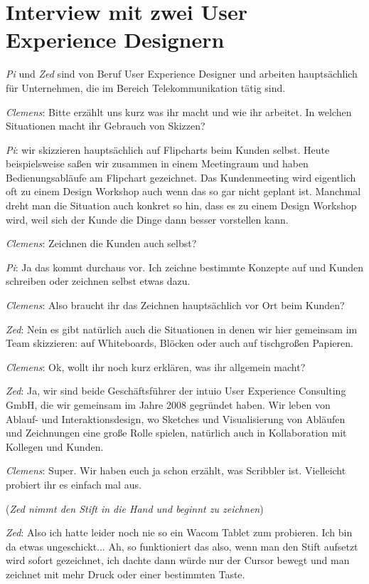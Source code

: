 \clearpage
\section{Interview mit zwei User Experience Designern}
\emph{Pi} und \emph{Zed} sind von Beruf User Experience Designer und arbeiten hauptsächlich für Unternehmen, die im Bereich Telekommunikation tätig sind. 

\medskip \emph{Clemens}: Bitte erzählt uns kurz was ihr macht und wie ihr arbeitet. In welchen Situationen macht ihr Gebrauch von Skizzen?

\medskip \emph{Pi}: wir skizzieren hauptsächlich auf Flipcharts beim Kunden selbst. Heute beispielsweise saßen wir zusammen in einem Meetingraum und haben Bedienungsabläufe am Flipchart gezeichnet. Das Kundenmeeting wird eigentlich oft zu einem Design Workshop auch wenn das so gar nicht geplant ist. Manchmal dreht man die Situation auch konkret so hin, dass es zu einem Design Workshop wird, weil sich der Kunde die Dinge dann besser vorstellen kann.

\medskip \emph{Clemens}: Zeichnen die Kunden auch selbst?

\medskip \emph{Pi}: Ja das kommt durchaus vor. Ich zeichne bestimmte Konzepte auf und Kunden schreiben oder zeichnen selbst etwas dazu.

\medskip \emph{Clemens}: Also braucht ihr das Zeichnen hauptsächlich vor Ort beim Kunden?

\medskip \emph{Zed}: Nein es gibt natürlich auch die Situationen in denen wir hier gemeinsam im Team skizzieren: auf Whiteboards, Blöcken oder auch auf tischgroßen Papieren.

\medskip \emph{Clemens}: Ok, wollt ihr noch kurz erklären, was ihr allgemein macht?

\medskip \emph{Zed}: Ja, wir sind beide Geschäftsführer der intuio User Experience Consulting GmbH, die wir gemeinsam im Jahre 2008 gegründet haben. Wir leben von Ablauf- und Interaktionsdesign, wo Sketches und Visualisierung von Abläufen und Zeichnungen eine große Rolle spielen, natürlich auch in Kollaboration mit Kollegen und Kunden. 

\medskip \emph{Clemens}: Super. Wir haben euch ja schon erzählt, was Scribbler ist. Vielleicht probiert ihr es einfach mal aus.

\medskip (\emph{Zed nimmt den Stift in die Hand und beginnt zu zeichnen})

\medskip \emph{Zed}: Also ich hatte leider noch nie so ein Wacom Tablet zum probieren. Ich bin da etwas ungeschickt... Ah, so funktioniert das also, wenn man den Stift aufsetzt wird sofort gezeichnet, ich dachte dann würde nur der Cursor bewegt und man zeichnet mit mehr Druck oder einer bestimmten Taste. 

